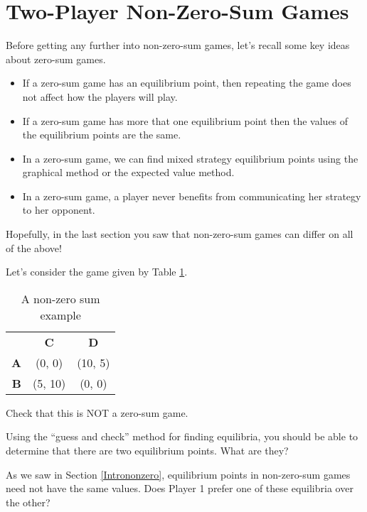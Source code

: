 
\section{Two-Player Non-Zero-Sum Games}\label{pdandchicken}

Before getting any further into non-zero-sum games, let's recall some key ideas about zero-sum games. 
\begin{itemize}
\item If a zero-sum game has an equilibrium point, then repeating the game does not affect how the players will play. 
\item If a zero-sum game has more that one equilibrium point then the values of the equilibrium points are the same.
\item In a zero-sum game, we can find mixed strategy equilibrium points using the graphical method or the expected value method.
\item In a zero-sum game, a player never benefits from communicating her strategy to her opponent.
\end{itemize}

Hopefully, in the last section you saw that non-zero-sum games can differ on all of the above!

\begin{example}\label{E:simplenonzero}
Let's  consider the game given by Table \ref{T:simplenonzero}.
\begin{table}[h]
\centering
\begin{tabular}{rcc}
&\textbf{C}&\textbf{D}\\ 
\textbf{A} &(0, 0)&(10, 5) \\ 
\textbf{B}&(5, 10)&(0, 0) \\ 
\end{tabular}
\caption{A non-zero sum example}
\label{T:simplenonzero}
\end{table}
\end{example}

\begin{xca}\label{E:simplenzero}
Check that this is NOT a zero-sum game. 
\end{xca}

\begin{xca}\label{E:simplefindequil}
Using the ``guess and check'' method for finding equilibria, you should be able to determine that there are two equilibrium points. What are they? 
\end{xca}

\begin{xca}\label{E:simpleprefer}
As we saw in Section \ref{Intrononzero}, equilibrium points in non-zero-sum games need not have the same values. Does Player 1 prefer one of these equilibria over the other?
\end{xca}

